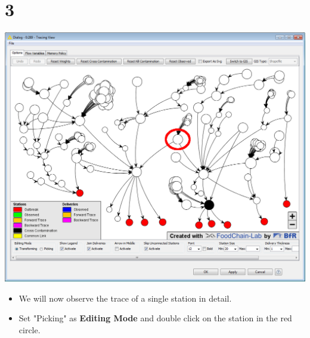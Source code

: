 \documentclass{beamer}
\begin{document}
\section{3}
\begin{frame}
	\begin{center}
  		\includegraphics[height=0.6\textheight]{3.png}
	\end{center}
	\begin{itemize}
		\item We will now observe the trace of a single station in detail.
		\item Set "Picking" as \textbf{Editing Mode} and double click on the station in the red circle.
	\end{itemize}
\end{frame}
\end{document}
